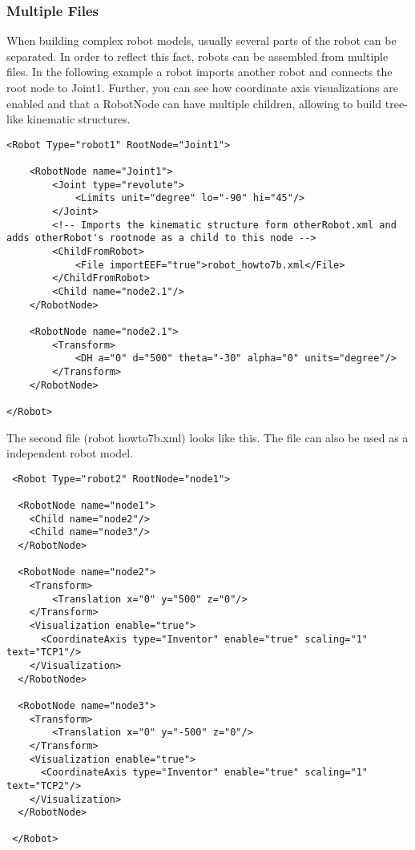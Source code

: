 \subsubsection*{Multiple Files}
\par
When building complex robot models, usually several parts of the robot can be separated. In order to reflect this fact, robots can be assembled from multiple files. In the following example a robot imports another robot and connects the root node to Joint1. Further, you can see how coordinate axis visualizations are enabled and that a RobotNode can have multiple children, allowing to build tree-like kinematic structures. 
\par
\begin{lstlisting}
<Robot Type="robot1" RootNode="Joint1">

    <RobotNode name="Joint1">
        <Joint type="revolute">
            <Limits unit="degree" lo="-90" hi="45"/>
        </Joint>
        <!-- Imports the kinematic structure form otherRobot.xml and adds otherRobot's rootnode as a child to this node -->
        <ChildFromRobot>
            <File importEEF="true">robot_howto7b.xml</File>
        </ChildFromRobot>
        <Child name="node2.1"/>
    </RobotNode>

    <RobotNode name="node2.1">
        <Transform>
            <DH a="0" d="500" theta="-30" alpha="0" units="degree"/>
        </Transform>
    </RobotNode>

</Robot>
\end{lstlisting}
\par
The second file (robot howto7b.xml) looks like this. The file can also be used as a independent robot model. 
 \par
 \begin{lstlisting}
 <Robot Type="robot2" RootNode="node1">
 
  <RobotNode name="node1">
    <Child name="node2"/>
    <Child name="node3"/>
  </RobotNode>
 
  <RobotNode name="node2">
    <Transform>
        <Translation x="0" y="500" z="0"/>
    </Transform>
    <Visualization enable="true">
      <CoordinateAxis type="Inventor" enable="true" scaling="1" text="TCP1"/>
    </Visualization>
  </RobotNode>
 
  <RobotNode name="node3">
    <Transform>
        <Translation x="0" y="-500" z="0"/>
    </Transform>
    <Visualization enable="true">
      <CoordinateAxis type="Inventor" enable="true" scaling="1" text="TCP2"/>
    </Visualization>
  </RobotNode>
 
 </Robot>
 \end{lstlisting}
 \par
